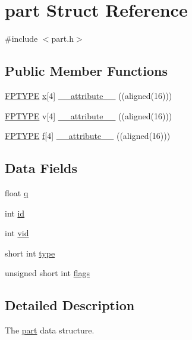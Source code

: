 \hypertarget{structpart}{\section{part Struct Reference}
\label{structpart}
}


{\ttfamily \#include $<$part.\-h$>$}

\subsection*{Public Member Functions}
\begin{DoxyCompactItemize}
\item 
\hyperlink{fptype_8h_a78f09a67f3e652a3b25e085a0082a835}{F\-P\-T\-Y\-P\-E} \hyperlink{potential__eval_8h_a83e62476eec76311df9cccc0496c8e95}{x}\mbox{[}4\mbox{]} \hyperlink{structpart_a87aab6d36389c356cbb9384b409fd9ea}{\-\_\-\-\_\-attribute\-\_\-\-\_\-} ((aligned(16)))
\item 
\hyperlink{fptype_8h_a78f09a67f3e652a3b25e085a0082a835}{F\-P\-T\-Y\-P\-E} v\mbox{[}4\mbox{]} \hyperlink{structpart_abaa61ca0d3ab51f683575172564ad9a9}{\-\_\-\-\_\-attribute\-\_\-\-\_\-} ((aligned(16)))
\item 
\hyperlink{fptype_8h_a78f09a67f3e652a3b25e085a0082a835}{F\-P\-T\-Y\-P\-E} \hyperlink{potential__eval_8h_a750f2e921706f49e7b9a819b8405f6c1}{f}\mbox{[}4\mbox{]} \hyperlink{structpart_a032cde3937a4f6f3ba5283dd3021dccc}{\-\_\-\-\_\-attribute\-\_\-\-\_\-} ((aligned(16)))
\end{DoxyCompactItemize}
\subsection*{Data Fields}
\begin{DoxyCompactItemize}
\item 
float \hyperlink{structpart_a0a19a0620af7373e3ddba0ce4e1058e1}{q}
\item 
int \hyperlink{structpart_a7441ef0865bcb3db9b8064dd7375c1ea}{id}
\item 
int \hyperlink{structpart_af1cae64e47ec410dab67cb572e4acd36}{vid}
\item 
short int \hyperlink{structpart_aaa8ba4297d83f2cce5af75b18564ae13}{type}
\item 
unsigned short int \hyperlink{structpart_ae718cba7f740adbac78a900ce25b73af}{flags}
\end{DoxyCompactItemize}


\subsection{Detailed Description}
The \hyperlink{structpart}{part} data structure.

